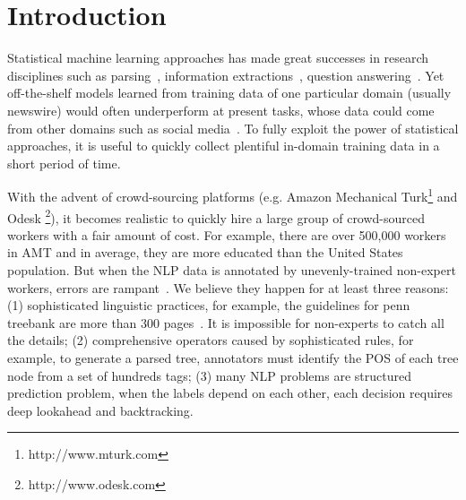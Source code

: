 \section{Introduction}
Statistical machine learning approaches has made great successes in research disciplines such as parsing~\cite{klein2003accurate}, information extractions~\cite{banko2007open}, question answering~\cite{kwok2001scaling}. Yet off-the-shelf models learned from training data of one particular domain (usually newswire) would often underperform at present tasks, whose data could come from other domains such as social media~\cite{zhang2013adaptive}. To fully exploit the power of statistical approaches, it is useful to quickly collect plentiful in-domain training data in a short period of time.

With the advent of crowd-sourcing platforms (e.g. Amazon Mechanical Turk\footnote{http://www.mturk.com} and Odesk \footnote{http://www.odesk.com}), it becomes realistic to quickly hire a large group of crowd-sourced workers with a fair amount of cost. For example, there are over 500,000 workers in AMT and in average, they are more educated than the United States population. But when the NLP data is annotated by unevenly-trained non-expert workers, errors are rampant~\cite{snow2008cheap}. We believe they happen for at least three reasons: (1) sophisticated linguistic practices, for example, the guidelines for penn treebank are more than 300 pages~\cite{bies1995bracketing}. It is impossible for non-experts to catch all the details; (2) comprehensive operators caused by sophisticated rules, for example, to generate a parsed tree, annotators must identify the POS of each tree node from a set of hundreds tags; (3) many NLP problems are structured prediction problem, when the labels depend on each other, each decision requires deep lookahead and backtracking.

